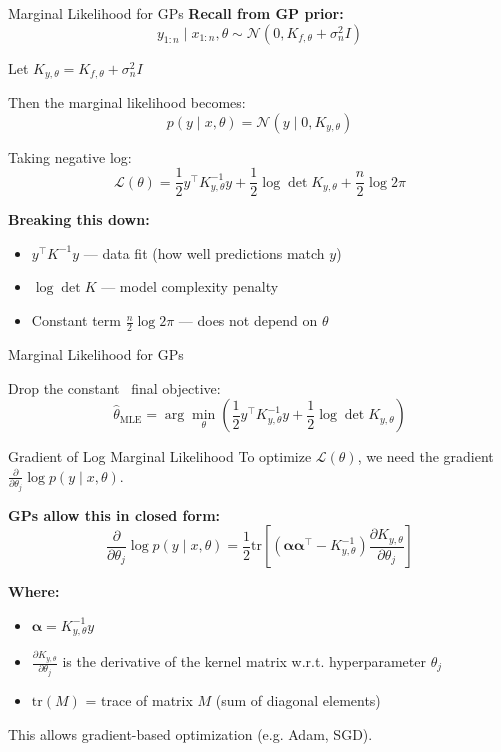 \documentclass[handout,aspectratio=169]{beamer}
\begin{document}
\begin{frame}{Marginal Likelihood for GPs}
\vspace{-0.2cm}
\textbf{Recall from GP prior:}
\[
y_{1:n} \mid x_{1:n}, \theta \sim \mathcal{N}(0, K_{f,\theta} + \sigma_n^2 I) \tag{4.27}
\]

Let $K_{y,\theta} = K_{f,\theta} + \sigma_n^2 I$

\pause
\vspace{0.3cm}
Then the marginal likelihood becomes:
\[
p(y \mid x, \theta) = \mathcal{N}(y \mid 0, K_{y,\theta})
\]

Taking negative log:
\[
\mathcal{L}(\theta) = \frac{1}{2} y^\top K_{y,\theta}^{-1} y + \frac{1}{2} \log \det K_{y,\theta} + \frac{n}{2} \log 2\pi \tag{4.28}
\]

\pause
\textbf{Breaking this down:}
\begin{itemize}
    \item $\boxed{y^\top K^{-1} y}$ — data fit (how well predictions match $y$)
    \item $\boxed{\log \det K}$ — model complexity penalty
    \item Constant term $\frac{n}{2} \log 2\pi$ — does not depend on $\theta$
\end{itemize}
\end{frame}

\begin{frame}{Marginal Likelihood for GPs}

Drop the constant \rightarrow \, final objective:
\[
\hat{\theta}_{\text{MLE}} = \arg\min_\theta \left(
\frac{1}{2} y^\top K_{y,\theta}^{-1} y + \frac{1}{2} \log \det K_{y,\theta}
\right) \tag{4.29}
\]
\end{frame}

\begin{frame}{Gradient of Log Marginal Likelihood}
To optimize $\mathcal{L}(\theta)$, we need the gradient $\frac{\partial}{\partial \theta_j} \log p(y \mid x, \theta)$.

\vspace{0.3cm}
\textbf{GPs allow this in closed form:}
\[
\frac{\partial}{\partial \theta_j} \log p(y \mid x, \theta)
= \frac{1}{2} \text{tr}\left[
\left( \boldsymbol{\alpha} \boldsymbol{\alpha}^\top - K^{-1}_{y,\theta} \right)
\frac{\partial K_{y,\theta}}{\partial \theta_j}
\right] \tag{4.30}
\]

\pause
\textbf{Where:}
\begin{itemize}
    \item $\boldsymbol{\alpha} = K_{y,\theta}^{-1} y$
    \item $\frac{\partial K_{y,\theta}}{\partial \theta_j}$ is the derivative of the kernel matrix w.r.t. hyperparameter $\theta_j$
    \item $\text{tr}(M)$ = trace of matrix $M$ (sum of diagonal elements)
\end{itemize}

\vspace{0.3cm}
This allows gradient-based optimization (e.g. Adam, SGD).
\end{frame}
\end{document}

